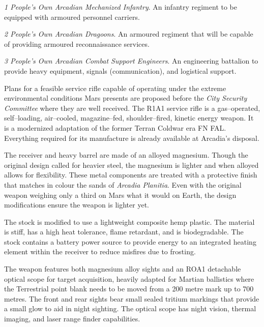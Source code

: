 \startitemize[4]
\item {\it 1 People's Own Arcadian Mechanized Infantry}. An infantry regiment to be equipped with armoured personnel carriers.

\item {\it 2 People's Own Arcadian Dragoons}. An armoured regiment that will be capable of providing armoured reconnaissance services.

\item {\it 3 People's Own Arcadian Combat Support Engineers}. An engineering battalion to provide heavy equipment, signals (communication), and logistical support.
\stopitemize
\StopTimelineDate

Plans for a feasible service rifle capable of operating under the extreme environmental conditions Mars presents are proposed before the {\it City Security Committee} where they are well received. The R1A1 service rifle is a gas--operated, self--loading, air--cooled, magazine--fed, shoulder--fired, kinetic energy weapon. It is a modernized adaptation of the former Terran Coldwar era FN FAL. Everything required for its manufacture is already available at Arcadia's disposal.

The receiver and heavy barrel are made of an alloyed magnesium. Though the original design called for heavier steel, the magnesium is lighter and when alloyed allows for flexibility. These metal components are treated with a protective finish that matches in colour the sands of {\it Arcadia Planitia}. Even with the original weapon weighing only a third on Mars what it would on Earth, the design modifications ensure the weapon is lighter yet.

The stock is modified to use a lightweight composite hemp plastic. The material is stiff, has a high heat tolerance, flame retardant, and is biodegradable. The stock contains a battery power source to provide energy to an integrated heating element within the receiver to reduce misfires due to frosting.

The weapon features both magnesium alloy sights and an ROA1 detachable optical scope for target acquisition, heavily adapted for Martian ballistics where the Terrestrial point blank needs to be moved from a 200 metre mark up to 700 metres. The front and rear sights bear small sealed tritium markings that provide a small glow to aid in night sighting. The optical scope has night vision, thermal imaging, and laser range finder capabilities.

